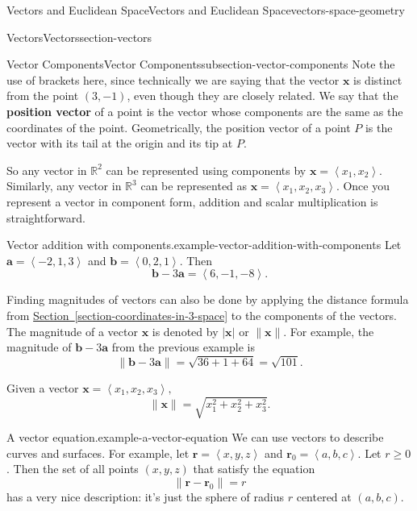 \documentclass[oneside,10pt,]{book}
\newcommand{\terminology}[1]{\textbf{#1}}
\numberwithin{equation}{section}
\newcommand{\RR}{\mathbb{R}}
\newcommand{\vv}[1]{\mathbf{#1}}
\newcommand{\dotprod}[1]{\left\langle #1 \right\rangle}
\begin{document}
\begin{chapterptx}{Vectors and Euclidean Space}{}{Vectors and Euclidean Space}{}{}{vectors-space-geometry}
\begin{sectionptx}{Vectors}{}{Vectors}{}{}{section-vectors}
\begin{subsectionptx}{Vector Components}{}{Vector Components}{}{}{subsection-vector-components}
Note the use of brackets here, since technically we are saying that the vector \(\vv{x}\) is distinct from the point \((3,-1)\), even though they are closely related. We say that the \terminology{position vector} of a point is the vector whose components are the same as the coordinates of the point. Geometrically, the position vector of a point \(P\) is the vector with its tail at the origin and its tip at \(P\).%
\par
\hypertarget{p-1090}{}%
So any vector in \(\RR^{2}\) can be represented using components by \(\vv{x} = \dotprod{x_{1},x_{2}}\). Similarly, any vector in \(\RR^{3}\) can be represented as \(\vv{x} = \dotprod{x_{1},x_{2},x_{3}}\). Once you represent a vector in component form, addition and scalar multiplication is straightforward.%
\begin{example}{Vector addition with components.}{example-vector-addition-with-components}%
\hypertarget{p-1091}{}%
Let \(\vv{a} = \dotprod{-2,1,3}\) and \(\vv{b} = \dotprod{0,2,1}\). Then%
%
\begin{equation*}
\vv{b}-3\vv{a} = \dotprod{6,-1,-8}.
\end{equation*}
\end{example}
\hypertarget{p-1092}{}%
Finding magnitudes of vectors can also be done by applying the distance formula from \hyperref[section-coordinates-in-3-space]{Section~\ref{section-coordinates-in-3-space}} to the components of the vectors. The magnitude of a vector \(\vv{x}\) is denoted by \(|\vv{x}|\) or \(\|\vv{x}\|\). For example, the magnitude of \(\vv{b}-3\vv{a}\) from the previous example is%
\begin{equation*}
\|\vv{b}-3\vv{a}\| = \sqrt{36+1+64} = \sqrt{101}.
\end{equation*}
%
\par
\hypertarget{p-1093}{}%
Given a vector \(\vv{x} = \dotprod{x_{1},x_{2},x_{3}},\)%
\begin{equation*}
\|\vv{x}\| = \sqrt{x_{1}^{2}+x_{2}^{2}+x_{3}^{2}}.
\end{equation*}
%
\begin{example}{A vector equation.}{example-a-vector-equation}%
\hypertarget{p-1094}{}%
We can use vectors to describe curves and surfaces. For example, let \(\vv{r} = \dotprod{x,y,z}\) and \(\vv{r}_{0} = \dotprod{a,b,c}\). Let \(r\geq0\). Then the set of all points \((x,y,z)\) that satisfy the equation%
%
\begin{equation*}
\|\vv{r}-\vv{r}_{0}\| = r
\end{equation*}
\hypertarget{p-1095}{}%
has a very nice description: it's just the sphere of radius \(r\) centered at \((a,b,c)\).%

\end{example}
\end{subsectionptx}
\end{sectionptx}
\end{chapterptx}
\end{document}
